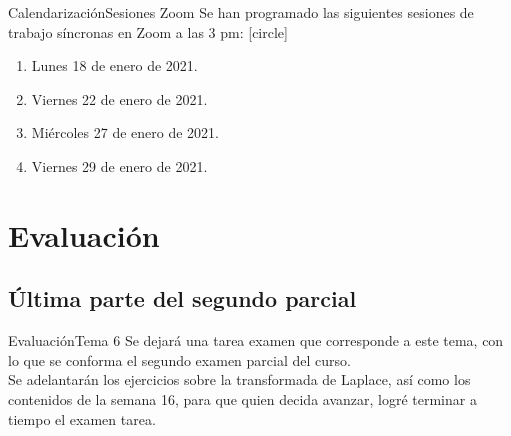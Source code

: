 \documentclass[10pt]{beamer}
\begin{document}
\begin{frame}{Calendarización}{Sesiones Zoom}
Se han programado las siguientes sesiones de trabajo síncronas en Zoom a las 3 pm:
[circle]
\begin{enumerate}[<+->]
\item Lunes 18 de enero de 2021.
\item Viernes 22 de enero de 2021.
\item Miércoles 27 de enero de 2021.
\item Viernes 29 de enero de 2021.
\end{enumerate}
\end{frame}
\section{Evaluación}
\subsection{Última parte del segundo parcial}
\begin{frame}{Evaluación}{Tema 6}
Se dejará una tarea examen que corresponde a este tema, con lo que se conforma el segundo examen parcial del curso.
\\
\bigskip
\pause
Se adelantarán los ejercicios sobre la transformada de Laplace, así como los contenidos de la semana 16, para que quien decida avanzar, logré terminar a tiempo el examen tarea.
\end{frame}
\end{document}
